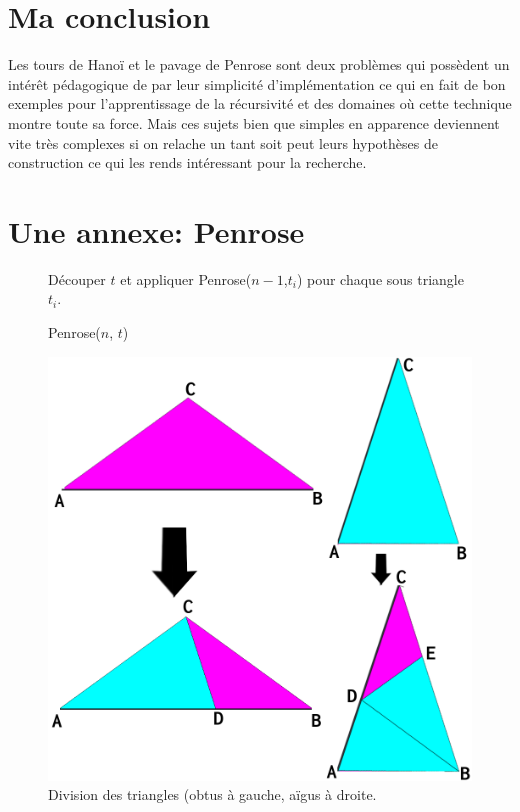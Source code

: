 \documentclass[a4paper,13pt]{article}
\begin{document}
\section{Ma conclusion}
 
Les tours de Hanoï et le pavage de Penrose sont deux problèmes qui possèdent un intérêt pédagogique de par leur simplicité d'implémentation ce qui en fait de bon exemples pour l'apprentissage de la récursivité et des domaines où cette technique montre toute sa force. Mais ces sujets bien que simples en apparence deviennent vite très complexes si on relache un tant soit peut leurs hypothèses de construction ce qui les rends intéressant pour la recherche.


\appendix
\section{Une annexe: Penrose}
\newpage
\begin{figure}
\begin{algorithm}[H]
  \caption{Penrose($n$, $t$)}
  { Découper $t$ et appliquer Penrose($n-1$,$t_i$) pour chaque sous triangle $t_i$.
   }
  \end{algorithm}
  \label{algo:penrose}
 \end{figure}
  
\begin{figure}
  \begin{center}
    \includegraphics[width=12cm]{triangle-generation1.png}
    \caption{Division des triangles (obtus à gauche, aïgus à droite.}
    \label{fig:decoupage1}
  \end{center}
\end{figure}
\end{document}
